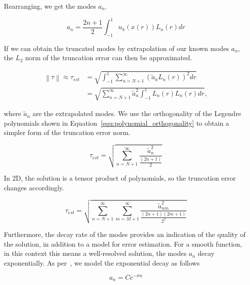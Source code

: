 \noindent
Rearranging, we get the modes \(a_n\).

\begin{equation} \label{equ:modes}
    a_n = \frac{2n + 1}{2}\int_{-1}^{1}u_h(x(r))L_n(r)dr
\end{equation}

\noindent
If we can obtain the truncated modes by extrapolation of our known modes \(a_n\), the \(L_2\) norm
of the truncation error can then be approximated.

\begin{equation} \label{equ:error_norm}
    \begin{aligned}
        \left \| \tau \right \| \approx \tau_{est} &= \sqrt{\int_{-1}^{1} \sum_{n = N + 1}^{\infty } {\left( \widetilde{a}_n L_n(r) \right)}^2 dr} \\
        &= \sqrt{\sum_{n = N + 1}^{\infty }\widetilde{a}_n^2 \int_{-1}^{1} L_n(r) L_n(r) dr},
    \end{aligned}
\end{equation}

\noindent
where \(\widetilde{a}_n\) are the extrapolated modes. We use the orthogonality of the Legendre
polynomials shown in Equation~\ref{equ:polynomial_orthogonality} to obtain a simpler form of the
truncation error norm.

\begin{equation} \label{equ:error_norm_1D}
    \tau_{est} = \sqrt{\sum_{n = N + 1}^{\infty } \frac{\widetilde{a}_{n}^2}{\frac{(2n + 1)}{2}}}
\end{equation}

\noindent
In 2D, the solution is a tensor product of polynomials, so the truncation error changes accordingly. 

\begin{equation} \label{equ:error_norm_2D}
    \tau_{est} = \sqrt{\sum_{n = N + 1}^{\infty } \sum_{m = M + 1}^{\infty}\frac{\widetilde{a}_{nm}^2}{\frac{(2n + 1)(2m + 1)}{2^2}}}
\end{equation}

Furthermore, the decay rate of the modes provides an indication of the quality of the solution, in
addition to a model for error estimation. For a smooth function, in this context this means a
well-resolved solution, the modes \(a_n\) decay exponentially. As per~\cite{Mavriplis1990}, we model
the exponential decay as follows

\begin{equation} \label{equ:exponential_decay}
    a_n = Ce^{-\sigma n}
\end{equation}

